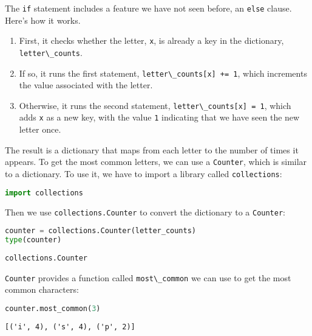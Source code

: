 The \passthrough{\lstinline!if!} statement includes a feature we have
not seen before, an \passthrough{\lstinline!else!} clause. Here's how it
works.

\begin{enumerate}
\def\labelenumi{\arabic{enumi}.}
\item
  First, it checks whether the letter, \passthrough{\lstinline!x!}, is
  already a key in the dictionary,
  \passthrough{\lstinline!letter\_counts!}.
\item
  If so, it runs the first statement,
  \passthrough{\lstinline!letter\_counts[x] += 1!}, which increments the
  value associated with the letter.
\item
  Otherwise, it runs the second statement,
  \passthrough{\lstinline!letter\_counts[x] = 1!}, which adds
  \passthrough{\lstinline!x!} as a new key, with the value
  \passthrough{\lstinline!1!} indicating that we have seen the new
  letter once.
\end{enumerate}

The result is a dictionary that maps from each letter to the number of
times it appears. To get the most common letters, we can use a
\passthrough{\lstinline!Counter!}, which is similar to a dictionary. To
use it, we have to import a library called
\passthrough{\lstinline!collections!}:

\begin{lstlisting}[language=Python,style=source]
import collections
\end{lstlisting}

Then we use \passthrough{\lstinline!collections.Counter!} to convert the
dictionary to a \passthrough{\lstinline!Counter!}:

\begin{lstlisting}[language=Python,style=source]
counter = collections.Counter(letter_counts)
type(counter)
\end{lstlisting}

\begin{lstlisting}[style=output]
collections.Counter
\end{lstlisting}

\passthrough{\lstinline!Counter!} provides a function called
\passthrough{\lstinline!most\_common!} we can use to get the most common
characters:

\begin{lstlisting}[language=Python,style=source]
counter.most_common(3)
\end{lstlisting}

\begin{lstlisting}[style=output]
[('i', 4), ('s', 4), ('p', 2)]
\end{lstlisting}

